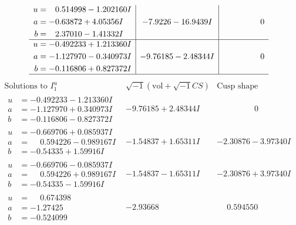 \documentclass[1p]{elsarticle_modified}
\theoremstyle{definition}
\newcommand{\I}{\sqrt{-1}}
\begin{document}
$$\begin{array}{c|c|c}
\begin{aligned}
u &= \phantom{-}0.514998 - 1.202160 I \\
a &= -0.63872 + 4.05356 I \\
b &= \phantom{-}2.37010 - 1.41332 I\end{aligned}
 & -7.9226 - 16.9439 I & \phantom{-0.000000 } 0 \\ \hline\begin{aligned}
u &= -0.492233 + 1.213360 I \\
a &= -1.127970 - 0.340973 I \\
b &= -0.116806 + 0.827372 I\end{aligned}
 & -9.76185 - 2.48344 I & \phantom{-0.000000 } 0\\
 \hline 
 \end{array}$$\newpage$$\begin{array}{c|c|c}  
\text{Solutions to }I^u_{1}& \I (\text{vol} + \sqrt{-1}CS) & \text{Cusp shape}\\
 \hline 
\begin{aligned}
u &= -0.492233 - 1.213360 I \\
a &= -1.127970 + 0.340973 I \\
b &= -0.116806 - 0.827372 I\end{aligned}
 & -9.76185 + 2.48344 I & \phantom{-0.000000 } 0 \\ \hline\begin{aligned}
u &= -0.669706 + 0.085937 I \\
a &= \phantom{-}0.594226 - 0.989167 I \\
b &= -0.54335 + 1.59916 I\end{aligned}
 & -1.54837 + 1.65311 I & -2.30876 - 3.97340 I \\ \hline\begin{aligned}
u &= -0.669706 - 0.085937 I \\
a &= \phantom{-}0.594226 + 0.989167 I \\
b &= -0.54335 - 1.59916 I\end{aligned}
 & -1.54837 - 1.65311 I & -2.30876 + 3.97340 I \\ \hline\begin{aligned}
u &= \phantom{-}0.674398\phantom{ +0.000000I} \\
a &= -1.27425\phantom{ +0.000000I} \\
b &= -0.524099\phantom{ +0.000000I}\end{aligned}
 & -2.93668\phantom{ +0.000000I} & \phantom{-}0.594550\phantom{ +0.000000I} \\ \hline\begin{aligned}

\end{aligned}
\end{array}$$
\end{document}
